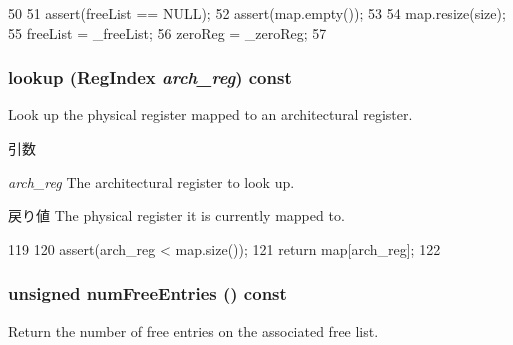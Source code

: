 \begin{DoxyCode}
50 {
51     assert(freeList == NULL);
52     assert(map.empty());
53 
54     map.resize(size);
55     freeList = _freeList;
56     zeroReg = _zeroReg;
57 }
\end{DoxyCode}
\hypertarget{classSimpleRenameMap_a149269d2ce2fbf7e13ec91a5647bf170}{
\subsubsection[{lookup}]{ lookup ({\bf RegIndex} {\em arch\_\-reg}) const}}
\label{classSimpleRenameMap_a149269d2ce2fbf7e13ec91a5647bf170}
Look up the physical register mapped to an architectural register. 
\begin{DoxyParams}{引数}
\item[{\em arch\_\-reg}]The architectural register to look up. \end{DoxyParams}
\begin{DoxyReturn}{戻り値}
The physical register it is currently mapped to. 
\end{DoxyReturn}



\begin{DoxyCode}
119     {
120         assert(arch_reg < map.size());
121         return map[arch_reg];
122     }
\end{DoxyCode}
\hypertarget{classSimpleRenameMap_a1fb7464c57712609e9d9ca38aff7fc8e}{
\subsubsection[{numFreeEntries}]{\setlength{\rightskip}{0pt plus 5cm}unsigned numFreeEntries () const}}
\label{classSimpleRenameMap_a1fb7464c57712609e9d9ca38aff7fc8e}
Return the number of free entries on the associated free list. 


